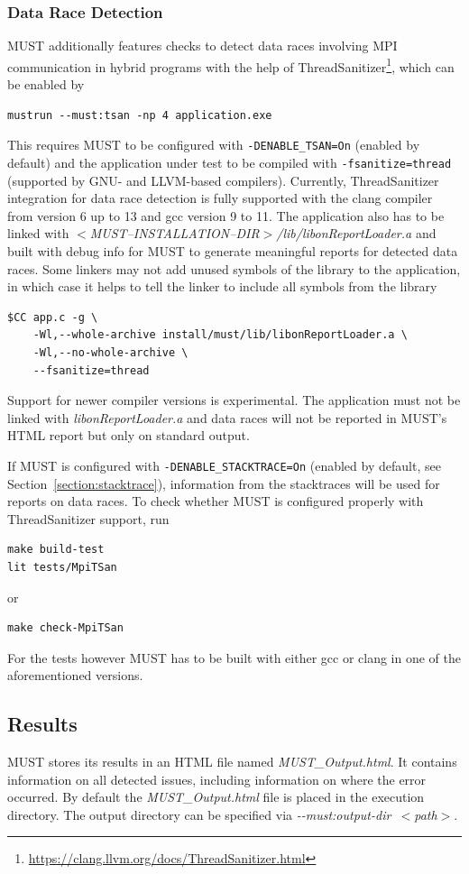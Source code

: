 \documentclass[english]{scrartcl}
\begin{document}
\subsubsection{Data Race Detection}
MUST additionally features checks to detect data races involving MPI communication in hybrid programs with the help of ThreadSanitizer\footnote{\url{https://clang.llvm.org/docs/ThreadSanitizer.html}}, which can be enabled by
\begin{verbatim}
mustrun --must:tsan -np 4 application.exe
\end{verbatim}
This requires MUST to be configured with \verb|-DENABLE_TSAN=On| (enabled by default) and the application under test to be compiled with \verb|-fsanitize=thread| (supported by GNU- and LLVM-based compilers).
Currently, ThreadSanitizer integration for data race detection is fully supported with the clang compiler from version 6 up to 13 and gcc version 9 to 11.
The application also has to be linked with \emph{$<$MUST\mbox{--}INSTALLATION\mbox{--}DIR$>$/lib/libonReportLoader.a} and built with debug info for MUST to generate meaningful reports for detected data races.
Some linkers may not add unused symbols of the library to the application, in which case it helps to tell the linker to include all symbols from the library
\begin{verbatim}
$CC app.c -g \
    -Wl,--whole-archive install/must/lib/libonReportLoader.a \
    -Wl,--no-whole-archive \
    --fsanitize=thread
\end{verbatim}

Support for newer compiler versions is experimental.
The application must not be linked with \emph{libonReportLoader.a} and data races will not be reported in MUST's HTML report but only on standard output.

If MUST is configured with \verb|-DENABLE_STACKTRACE=On| (enabled by default, see Section~\ref{section:stacktrace}), information from the stacktraces will be used for reports on data races.
To check whether MUST is configured properly with ThreadSanitizer support, run
\begin{verbatim}
make build-test
lit tests/MpiTSan
\end{verbatim}
or
\begin{verbatim}
make check-MpiTSan
\end{verbatim}
For the tests however MUST has to be built with either gcc or clang in one of the aforementioned versions.

\subsection{Results}
MUST stores its results in an HTML file named \emph{MUST\_Output.html}. It
contains information on all detected issues, including information on where the
error occurred.
By default the \emph{MUST\_Output.html} file is placed in the execution directory.
The output directory can be specified via \mbox{\emph{\mbox{-{}-must:output-dir $<$path$>$}}}.
\end{document}
